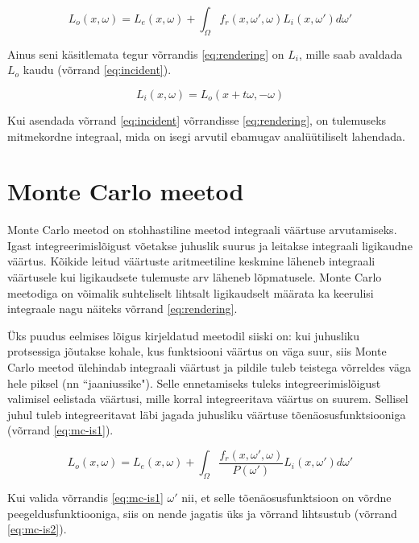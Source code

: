 \documentclass[a4paper,12pt]{report}
\begin{document}
\begin{equation} \label{eq:rendering}
L_o(x, \omega) = L_e(x, \omega) + \int_\Omega f_r(x, \omega', \omega) L_i(x, \omega') d\omega'
\end{equation}

Ainus seni käsitlemata tegur võrrandis \ref{eq:rendering} on \(L_i\),
mille saab avaldada \(L_o\) kaudu (võrrand \ref{eq:incident}). 

\begin{equation} \label{eq:incident}
L_i(x, \omega) = L_o(x + t\omega, -\omega)
\end{equation}

Kui asendada võrrand \ref{eq:incident} võrrandisse \ref{eq:rendering},
on tulemuseks mitmekordne integraal, mida on isegi arvutil ebamugav
analüütiliselt lahendada.

\section{Monte Carlo meetod}
Monte Carlo meetod on stohhastiline meetod integraali väärtuse arvutamiseks.
Igast integreerimislõigust võetakse juhuslik suurus ja leitakse integraali
ligikaudne väärtus. Kõikide leitud väärtuste aritmeetiline keskmine
läheneb integraali väärtusele kui ligikaudsete tulemuste arv läheneb
lõpmatusele. Monte Carlo meetodiga on võimalik suhteliselt lihtsalt
ligikaudselt määrata ka keerulisi integraale nagu näiteks võrrand \ref{eq:rendering}.

Üks puudus eelmises lõigus kirjeldatud meetodil siiski on: kui juhusliku
protsessiga jõutakse kohale, kus funktsiooni väärtus on väga suur, siis
Monte Carlo meetod ülehindab integraali väärtust ja pildile tuleb teistega
võrreldes väga hele piksel (nn ``jaaniussike"). Selle ennetamiseks tuleks
integreerimislõigust valimisel eelistada väärtusi, mille korral
integreeritava väärtus on suurem. Sellisel juhul tuleb integreeritavat
läbi jagada juhusliku väärtuse tõenäosusfunktsiooniga (võrrand \ref{eq:mc-is1}).

\begin{equation} \label{eq:mc-is1}
L_o(x, \omega) = L_e(x, \omega) + \int_\Omega \frac{f_r(x, \omega', \omega)}{P(\omega')} L_i(x, \omega') d\omega'
\end{equation}

Kui valida võrrandis \ref{eq:mc-is1} \(\omega'\) nii, et selle
tõenäosusfunktsioon on võrdne peegeldusfunktiooniga, siis on nende
jagatis üks ja võrrand lihtsustub (võrrand \ref{eq:mc-is2}).
\end{document}

